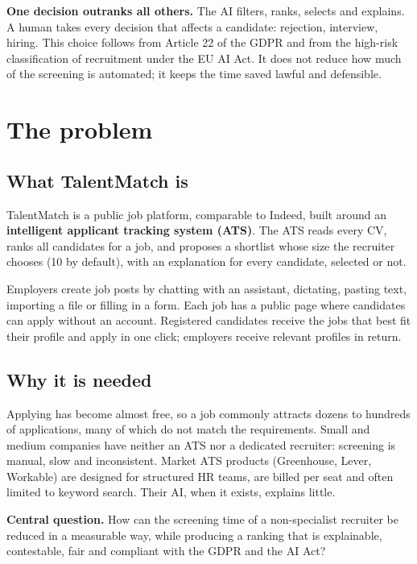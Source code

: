 \documentclass[11pt,a4paper]{article}
\begin{document}
\begin{callout}
\textbf{One decision outranks all others.} The AI filters, ranks, selects and explains. A human takes every decision that affects a candidate: rejection, interview, hiring. This choice follows from Article 22 of the GDPR and from the high-risk classification of recruitment under the EU AI Act. It does not reduce how much of the screening is automated; it keeps the time saved lawful and defensible.
\end{callout}

\section{The problem}
\subsection{What TalentMatch is}
TalentMatch is a public job platform, comparable to Indeed, built around an \textbf{intelligent applicant tracking system (ATS)}. The ATS reads every CV, ranks all candidates for a job, and proposes a shortlist whose size the recruiter chooses (10 by default), with an explanation for every candidate, selected or not.

Employers create job posts by chatting with an assistant, dictating, pasting text, importing a file or filling in a form. Each job has a public page where candidates can apply without an account. Registered candidates receive the jobs that best fit their profile and apply in one click; employers receive relevant profiles in return.

\subsection{Why it is needed}
Applying has become almost free, so a job commonly attracts dozens to hundreds of applications, many of which do not match the requirements. Small and medium companies have neither an ATS nor a dedicated recruiter: screening is manual, slow and inconsistent. Market ATS products (Greenhouse, Lever, Workable) are designed for structured HR teams, are billed per seat and often limited to keyword search. Their AI, when it exists, explains little.

\textbf{Central question.} How can the screening time of a non-specialist recruiter be reduced in a measurable way, while producing a ranking that is explainable, contestable, fair and compliant with the GDPR and the AI Act?
\end{document}
